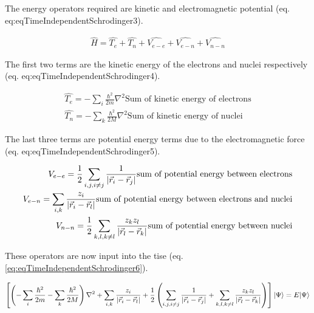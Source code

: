 The energy operators required are kinetic and electromagnetic potential (eq. {eq:eqTimeIndependentSchrodinger3}).

\begin{equation}
\begin{split}
\hat{H} = \hat{T_e} + \hat{T_n} + \hat{V_{e-e}} + \hat{V_{e-n}} + \hat{V_{n-n}}
\end{split}
\label{eq:eqTimeIndependentSchrodinger3}
\end{equation}

The first two terms are the kinetic energy of the electrons and nuclei respectively (eq. {eq:eqTimeIndependentSchrodinger4}).

\begin{equation}
\begin{split}
\hat{T_e} = - \sum_{i} \frac{\hbar^2}{2 m}  \nabla^2 \text{Sum of kinetic energy of electrons} \\
\hat{T_n} = - \sum_{k} \frac{\hbar^2}{2 M}  \nabla^2 \text{Sum of kinetic energy of nuclei}
\end{split}
\label{eq:eqTimeIndependentSchrodinger4}
\end{equation}

The last three terms are potential energy terms due to the electromagnetic force (eq. {eq:eqTimeIndependentSchrodinger5}). 

\begin{equation}
\begin{split}
V_{e-e} = \frac{1}{2} \sum_{i,j,i \neq j} \frac{1}{\abs{\vec{r}_i - \vec{r}_j}} \text{sum of potential energy between electrons} \\
V_{e-n} = \sum_{i,k} \frac{z_i}{\abs{\vec{r}_i - \vec{r}_l}} \text{sum of potential energy between electrons and nuclei} \\
V_{n-n} = \frac{1}{2} \sum_{k,l,k \neq l} \frac{z_k z_l}{\abs{\vec{r}_l - \vec{r}_k}} \text{sum of potential energy between nuclei}
\end{split}
\label{eq:eqTimeIndependentSchrodinger5}
\end{equation}

These operators are now input into the \acrshort{tise} (eq. \ref{eq:eqTimeIndependentSchrodinger6}).


\begin{equation}
\begin{split}
\left[ \left(- \sum_{i} \frac{\hbar^2}{2 m} - \sum_{k} \frac{\hbar^2}{2 M} \right) \nabla^2  + \sum_{i,k} \frac{z_i}{\abs{\vec{r}_i - \vec{r}_l}} + \frac{1}{2} \left( \sum_{i,j,i \neq j} \frac{1}{\abs{\vec{r}_i - \vec{r}_j}} + \sum_{k,l,k \neq l} \frac{z_k z_l}{\abs{\vec{r}_l - \vec{r}_k}} \right) \right] \lvert \Psi \rangle = E \lvert \Psi \rangle
\end{split}
\label{eq:eqTimeIndependentSchrodinger6}
\end{equation}



